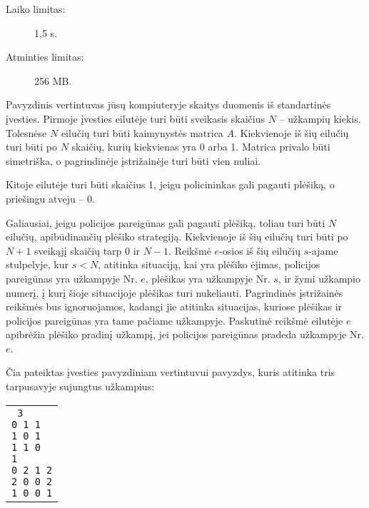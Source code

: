 \documentclass{boi2014-lt}
\begin{document}
    \begin{description}
        \item[Laiko limitas:] 1,5 s.
        \item[Atminties limitas:] 256 MB.
    \end{description}
    
    \pagebreak

    \Experimentation
	Pavyzdinis vertintuvas jūsų kompiuteryje skaitys duomenis iš standartinės
	įvesties. Pirmoje įvesties eilutėje turi būti sveikasis skaičius $N$ --
	užkampių kiekis. Tolesnėse $N$ eilučių turi būti kaimynystės matrica $A$.
	Kiekvienoje iš šių eilučių turi būti po $N$ skaičių, kurių kiekvienas yra
	0 arba 1. Matrica privalo būti simetriška, o pagrindinėje įstrižainėje
	turi būti vien nuliai.

	Kitoje eilutėje turi būti skaičius 1, jeigu policininkas gali pagauti
	plėšiką, o priešingu atveju -- 0.

	Galiausiai, jeigu policijos pareigūnas gali pagauti plėšiką, toliau turi
	būti $N$ eilučių, apibūdinančių plėšiko strategiją. Kiekvienoje iš šių
	eilučių turi būti po $N + 1$ sveikąjį skaičių tarp 0 ir $N - 1$. Reikšmė
	$e$-osios iš šių eilučių $s$-ajame stulpelyje, kur $s < N$, atitinka
	situaciją, kai yra plėšiko ėjimas, policijos pareigūnas yra užkampyje
	Nr. $e$, plėšikas yra užkampyje Nr. $s$, ir žymi užkampio numerį, į kurį
	šioje situacijoje plėšikas turi nukeliauti. Pagrindinės įstrižainės
	reikšmės bus ignoruojamos, kadangi jie atitinka situacijas, kuriose
	plėšikas ir policijos pareigūnas yra tame pačiame užkampyje. Paskutinė
	reikšmė eilutėje $e$ apibrėžia plėšiko pradinį užkampį, jei policijos
	pareigūnas pradeda užkampyje Nr. $e$.

	Čia pateiktas įvesties pavyzdiniam vertintuvui pavyzdys, kuris atitinka
	tris tarpusavyje sujungtus užkampius:

    \begin{center}
        \begin{tabular}{p{4cm}}
            {\tt
                3 \newline
                0 1 1 \newline
                1 0 1 \newline
                1 1 0 \newline
                1 \newline
                0 2 1 2 \newline
                2 0 0 2 \newline
                1 0 0 1 \newline
            }
        \end{tabular}
    \end{center}
\end{document}
